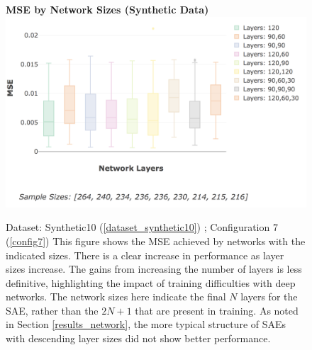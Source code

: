 \documentclass[a4paper,11pt,oneside]{article}
\theoremstyle{plain}
\theoremstyle{definition}
\begin{document}
	\begin{figure}[H]
		\centering 
		\textbf{MSE by Network Sizes (Synthetic Data)}
		\includegraphics[scale=0.4]{images/results/8_appendix/synth_mse_box.png} 
		\caption[MSE By Network Sizes (Synthetic Data)]{Dataset: Synthetic10 (\ref{dataset_synthetic10}) ; Configuration 7 (\ref{config7})
			\newline This figure shows the MSE achieved by networks with the indicated sizes. There is a clear increase in performance as layer sizes increase. The gains from increasing the number of layers is less definitive, highlighting the impact of training difficulties with deep networks. The network sizes here indicate the final $N$ layers for the SAE, rather than the $2N + 1$ that are present in training. As noted in Section \ref{results_network}, the more typical structure of SAEs with descending layer sizes did not show better performance.}
		\label{figure-synth_mse_box}
	\end{figure}
	
\end{document}
